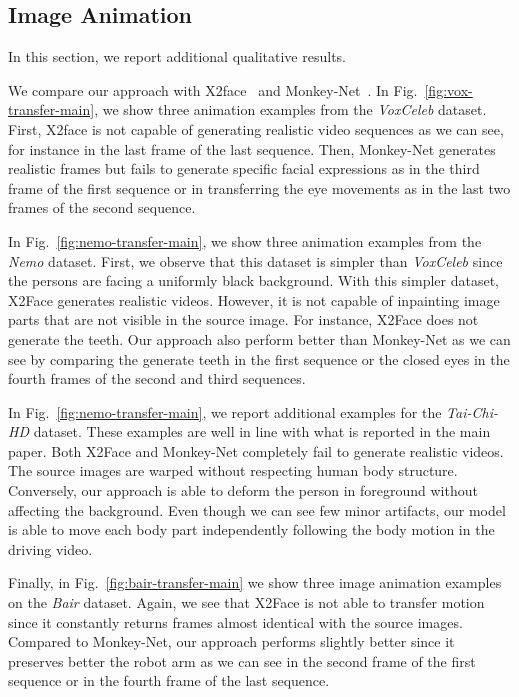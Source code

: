 \documentclass{article}
\begin{document}
\subsection{Image Animation}
In this section, we report additional qualitative results.  

We compare our approach with  X2face~\cite{wiles2018x2face} and Monkey-Net~\cite{siarohin2018animating}. In Fig.~\ref{fig:vox-transfer-main}, we show three animation examples from the \emph{VoxCeleb} dataset. First, X2face is not capable of generating realistic video sequences as we can see, for instance in the last frame of the last sequence. Then, Monkey-Net generates realistic frames but fails to generate specific facial expressions as in the third frame of the first sequence or in transferring the eye movements as in the last two frames of the second sequence.

In Fig.~\ref{fig:nemo-transfer-main}, we show three animation examples from the \emph{Nemo} dataset. First, we observe that this dataset is simpler than \emph{VoxCeleb} since the persons are facing a uniformly black background. With this simpler dataset, X2Face generates realistic videos. However, it is not capable of inpainting image parts that are not visible in the source image. For instance, X2Face does not generate the teeth. Our approach also perform better than Monkey-Net as we can see by comparing the generate teeth in the first sequence or the closed eyes in the fourth frames of the second and third sequences.

In Fig.~\ref{fig:nemo-transfer-main}, we report additional examples for the \emph{Tai-Chi-HD} dataset. These examples are well in line with what is reported in the main paper. Both X2Face and Monkey-Net completely fail to generate realistic videos. The source images are warped without respecting human body structure. Conversely, our approach is able to deform the person in foreground without affecting the background. Even though we can see few minor artifacts, our model is able to move each body part independently following the body motion in the driving video.

Finally, in Fig.~\ref{fig:bair-transfer-main} we show three image animation examples on the \emph{Bair} dataset.
Again, we see that X2Face is not able to transfer motion since it constantly returns frames almost identical with the source images. Compared to Monkey-Net, our approach performs slightly better since it preserves better the robot arm as we can see in the second frame of the first sequence or in the fourth frame of the last sequence.
\end{document}
